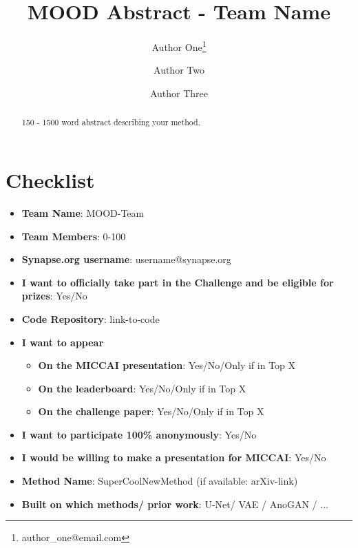 \documentclass{article}
\title{MOOD Abstract - Team Name}
\begin{document}
\author[1]{Author One\thanks{author\_one@email.com}}
\author[1]{Author Two}
\author[2]{Author Three}


\date{}

\maketitle

\begin{abstract}

150 - 1500 word abstract describing your method. 

\blindtext[2]

\end{abstract}


\newpage

\section*{Checklist}

\begin{itemize}
    \item \textbf{Team Name}: MOOD-Team
    \item \textbf{Team Members}: 0-100
    \item \textbf{Synapse.org username}: username@synapse.org
    \item \textbf{I want to officially take part in the Challenge and be eligible for prizes}: Yes/No
    \item \textbf{Code Repository}: link-to-code
    \item \textbf{I want to appear}
    \begin{itemize}
        \item \textbf{On the MICCAI presentation}: Yes/No/Only if in Top X 
        \item \textbf{On the leaderboard}: Yes/No/Only if in Top X 
        \item \textbf{On the challenge paper}: Yes/No/Only if in Top X 
    \end{itemize}
    \item \textbf{I want to participate 100\% anonymously}: Yes/No
    \item \textbf{I would be willing to make a presentation for MICCAI}: Yes/No
    \item \textbf{Method Name}: SuperCoolNewMethod (if available: arXiv-link)
    \item \textbf{Built on which methods/ prior work}: U-Net/ VAE / AnoGAN / ... 
    
    
\end{itemize}



\end{document}
